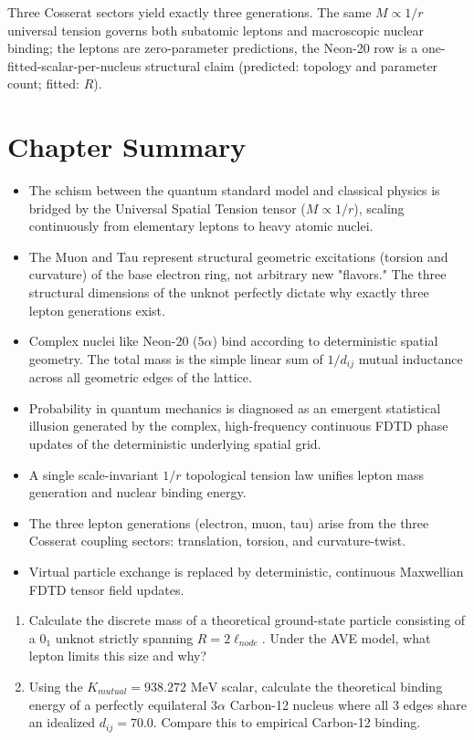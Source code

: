 \noindent Three Cosserat sectors yield exactly three generations. The same $M \propto 1/r$ universal tension governs both subatomic leptons and macroscopic nuclear binding; the leptons are zero-parameter predictions, the Neon-20 row is a one-fitted-scalar-per-nucleus structural claim (predicted: topology and parameter count; fitted: $R$).

\section*{Chapter Summary}
\begin{itemize}
    \item The schism between the quantum standard model and classical physics is bridged by the Universal Spatial Tension tensor ($M \propto 1/r$), scaling continuously from elementary leptons to heavy atomic nuclei.
    \item The Muon and Tau represent structural geometric excitations (torsion and curvature) of the base electron ring, not arbitrary new "flavors." The three structural dimensions of the unknot perfectly dictate why exactly three lepton generations exist.
    \item Complex nuclei like Neon-20 ($5\alpha$) bind according to deterministic spatial geometry. The total mass is the simple linear sum of $1/d_{ij}$ mutual inductance across all geometric edges of the lattice.
    \item Probability in quantum mechanics is diagnosed as an emergent statistical illusion generated by the complex, high-frequency continuous FDTD phase updates of the deterministic underlying spatial grid.
\end{itemize}

\begin{summarybox}
\begin{itemize}
    \item A single scale-invariant $1/r$ topological tension law unifies lepton mass generation and nuclear binding energy.
    \item The three lepton generations (electron, muon, tau) arise from the three Cosserat coupling sectors: translation, torsion, and curvature-twist.
    \item Virtual particle exchange is replaced by deterministic, continuous Maxwellian FDTD tensor field updates.
\end{itemize}
\end{summarybox}

\begin{exercisebox}
\begin{enumerate}
    \item Calculate the discrete mass of a theoretical ground-state particle consisting of a $0_1$ unknot strictly spanning $R = 2\ell_{node}$. Under the AVE model, what lepton limits this size and why?
    \item Using the $K_{mutual} = 938.272\text{ MeV}$ scalar, calculate the theoretical binding energy of a perfectly equilateral $3\alpha$ Carbon-12 nucleus where all 3 edges share an idealized $d_{ij} = 70.0$. Compare this to empirical Carbon-12 binding.
\end{enumerate}
\end{exercisebox}
